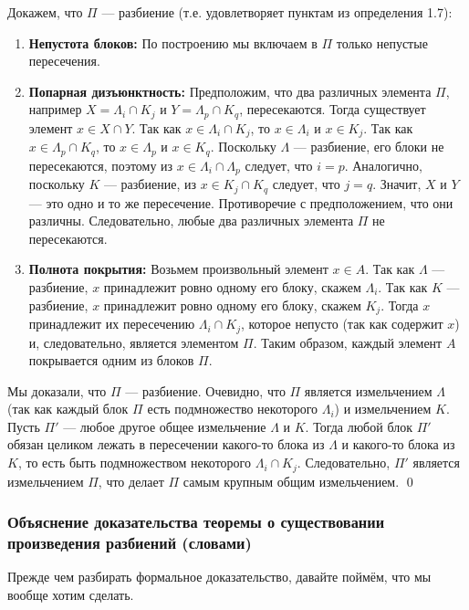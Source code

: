 \documentclass[a4paper,12pt]{article}
\begin{document}
Докажем, что $\Pi$ — разбиение (т.е. удовлетворяет пунктам из определения 1.7):
\begin{enumerate}
	\item \textbf{Непустота блоков:} По построению мы включаем в $\Pi$ только непустые пересечения.
	\item \textbf{Попарная дизъюнктность:} Предположим, что два различных элемента $\Pi$, например $X = \Lambda_i \cap K_j$ и $Y = \Lambda_p \cap K_q$, пересекаются. Тогда существует элемент $x \in X \cap Y$.
	Так как $x \in \Lambda_i \cap K_j$, то $x \in \Lambda_i$ и $x \in K_j$.
	Так как $x \in \Lambda_p \cap K_q$, то $x \in \Lambda_p$ и $x \in K_q$.
	Поскольку $\Lambda$ — разбиение, его блоки не пересекаются, поэтому из $x \in \Lambda_i \cap \Lambda_p$ следует, что $i = p$.
	Аналогично, поскольку $K$ — разбиение, из $x \in K_j \cap K_q$ следует, что $j = q$.
	Значит, $X$ и $Y$ — это одно и то же пересечение. Противоречие с предположением, что они различны. Следовательно, любые два различных элемента $\Pi$ не пересекаются.
	\item \textbf{Полнота покрытия:} Возьмем произвольный элемент $x \in A$. Так как $\Lambda$ — разбиение, $x$ принадлежит ровно одному его блоку, скажем $\Lambda_i$. Так как $K$ — разбиение, $x$ принадлежит ровно одному его блоку, скажем $K_j$. Тогда $x$ принадлежит их пересечению $\Lambda_i \cap K_j$, которое непусто (так как содержит $x$) и, следовательно, является элементом $\Pi$. Таким образом, каждый элемент $A$ покрывается одним из блоков $\Pi$.
\end{enumerate}
Мы доказали, что $\Pi$ — разбиение. Очевидно, что $\Pi$ является измельчением $\Lambda$ (так как каждый блок $\Pi$ есть подмножество некоторого $\Lambda_i$) и измельчением $K$. Пусть $\Pi'$ — любое другое общее измельчение $\Lambda$ и $K$. Тогда любой блок $\Pi'$ обязан целиком лежать в пересечении какого-то блока из $\Lambda$ и какого-то блока из $K$, то есть быть подмножеством некоторого $\Lambda_i \cap K_j$. Следовательно, $\Pi'$ является измельчением $\Pi$, что делает $\Pi$ самым крупным общим измельчением. \qed



\subsubsection*{Объяснение доказательства теоремы о существовании произведения разбиений (словами)}

Прежде чем разбирать формальное доказательство, давайте поймём, что мы вообще хотим сделать.
\end{document}
